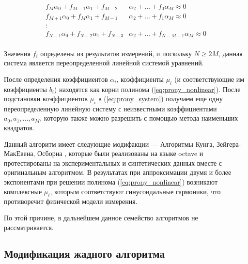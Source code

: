 \begin{equation}
  \begin{split}
  f_M \alpha_0 + f_{M-1} \alpha_1 + f_{M-2} & \alpha_2 + \ldots + f_0 \alpha_M \approx 0  \\
  f_{M+1} \alpha_0 + f_{M} \alpha_1 + f_{M-1} & \alpha_2 + \ldots + f_1 \alpha_M \approx 0 \\
  \vdots & \\
  f_{N-1} \alpha_0 + f_{N-2} \alpha_1 + f_{N-3} & \alpha_2 + \ldots + f_{N-M-1} \alpha_M \approx 0  \\
  \end{split}
  \label{eq:prony_system2}
\end{equation}

Значения $f_i$ определены из результатов измерений, и поскольку $N \geq 2M$, данная система является переопределенной линейной системой уравнений.

После определения коэффициентов $\alpha_i$, коэффициенты $\mu_i$ (и соответствующие им коэффициенты $b_i$) находятся как корни полинома (\ref{eq:prony_nonlinear}). После подстановки коэффициентов $\mu_i$ в (\ref{eq:prony_system}) получаем еще одну переопределенную линейную систему с неизвестными коэффициентами $a_0, a_1, \ldots, a_M$, которую также можно разрешить с помощью метода наименьших квадратов.  


Данный алгоритм имеет следующие модифакции --- Алгоритмы Кунга, Зейгера-МакЕвена, Осборна \cite{kung, zeiger, osborn}, которые были реализованы на языке octave и протестированы на экспериментальных и синтетических данных вместе с оригинальным алгоритмом. В результатах при аппроксимации двумя и более экспонентами при решении полинома (\ref{eq:prony_nonlinear}) возникают комплексные $\mu_i$, которым соответствуют синусоидальные гармоники, что противоречит физической модели измерения. 

По этой причине, в дальнейшем данное семейство алгоритмов не рассматривается.




\subsection{Модификация жадного алгоритма}\label{subsect2_3_4}

